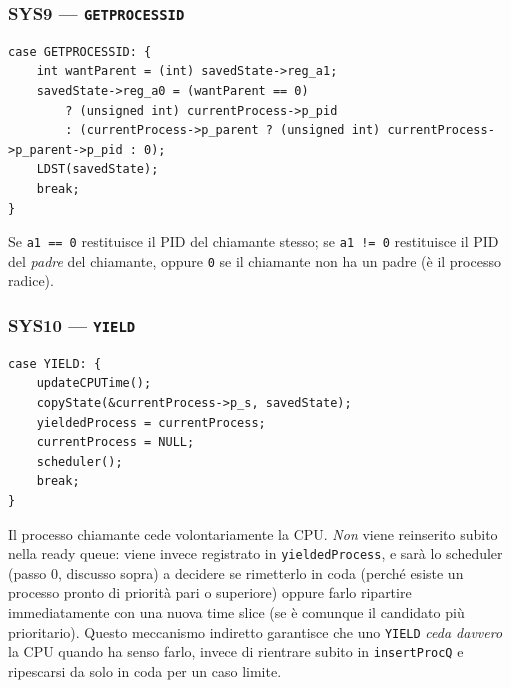 \documentclass[11pt,a4paper]{article}
\newcommand{\code}[1]{\texttt{#1}}
\begin{document}
\subsubsection{SYS9 --- \code{GETPROCESSID}}
\begin{lstlisting}
case GETPROCESSID: {
    int wantParent = (int) savedState->reg_a1;
    savedState->reg_a0 = (wantParent == 0)
        ? (unsigned int) currentProcess->p_pid
        : (currentProcess->p_parent ? (unsigned int) currentProcess->p_parent->p_pid : 0);
    LDST(savedState);
    break;
}
\end{lstlisting}
Se \code{a1 == 0} restituisce il PID del chiamante stesso; se \code{a1 !=
0} restituisce il PID del \emph{padre} del chiamante, oppure \code{0} se il
chiamante non ha un padre (è il processo radice).

\subsubsection{SYS10 --- \code{YIELD}}
\begin{lstlisting}
case YIELD: {
    updateCPUTime();
    copyState(&currentProcess->p_s, savedState);
    yieldedProcess = currentProcess;
    currentProcess = NULL;
    scheduler();
    break;
}
\end{lstlisting}
Il processo chiamante cede volontariamente la CPU. \emph{Non} viene
reinserito subito nella ready queue: viene invece registrato in
\code{yieldedProcess}, e sarà lo scheduler (passo 0, discusso sopra) a
decidere se rimetterlo in coda (perché esiste un processo pronto di
priorità pari o superiore) oppure farlo ripartire immediatamente con una
nuova time slice (se è comunque il candidato più prioritario). Questo
meccanismo indiretto garantisce che uno \code{YIELD} \emph{ceda davvero} la
CPU quando ha senso farlo, invece di rientrare subito in
\code{insertProcQ} e ripescarsi da solo in coda per un caso limite.
\end{document}
